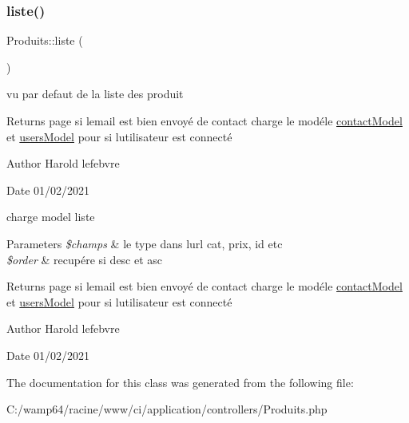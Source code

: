 \subsubsection{\texorpdfstring{liste()}{liste()}}
{\footnotesize\ttfamily Produits\+::liste (\begin{DoxyParamCaption}{ }\end{DoxyParamCaption})}



vu par defaut de la liste des produit 

\begin{DoxyReturn}{Returns}
page si l\textquotesingle{}email est bien envoyé de contact charge le modéle \mbox{\hyperlink{classcontact_model}{contact\+Model}} et \mbox{\hyperlink{classusers_model}{users\+Model}} pour si l\textquotesingle{}utilisateur est connecté 
\end{DoxyReturn}
\begin{DoxyAuthor}{Author}
Harold lefebvre 
\end{DoxyAuthor}
\begin{DoxyDate}{Date}
01/02/2021 
\end{DoxyDate}
charge model liste 
\begin{DoxyParams}{Parameters}
{\em \$champs} & le type dans l\textquotesingle{}url cat, prix, id etc \\
\hline
{\em \$order} & recupére si desc et asc \\
\hline
\end{DoxyParams}
\begin{DoxyReturn}{Returns}
page si l\textquotesingle{}email est bien envoyé de contact charge le modéle \mbox{\hyperlink{classcontact_model}{contact\+Model}} et \mbox{\hyperlink{classusers_model}{users\+Model}} pour si l\textquotesingle{}utilisateur est connecté 
\end{DoxyReturn}
\begin{DoxyAuthor}{Author}
Harold lefebvre 
\end{DoxyAuthor}
\begin{DoxyDate}{Date}
01/02/2021
\end{DoxyDate}


The documentation for this class was generated from the following file\+:\begin{DoxyCompactItemize}
\item 
C\+:/wamp64/racine/www/ci/application/controllers/Produits.\+php\end{DoxyCompactItemize}
